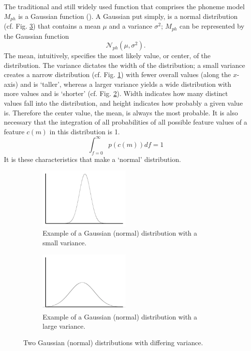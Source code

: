 The traditional and still widely used function that comprises the phoneme model $M_{ph}$ is a Gaussian function (\cite{gales:07}).  A Gaussian put simply, is a normal distribution (cf. Fig. \ref{fig:norm-dist}) that contains a mean $\mu$ and a variance $\sigma^2$; $M_{ph}$ can be represented by the Gaussian function \begin{equation} \mathcal{N}_{ph}(\mu,\sigma^2). \end{equation}  The mean, intuitively, specifies the most likely value, or center, of the distribution.  The variance dictates the width of the distribution; a small variance creates a narrow distribution (cf. Fig. \ref{fig:norm-narrow}) with fewer overall values (along the $x$-axis) and is `taller', whereas a larger variance yields a wide distribution with more values and is `shorter' (cf. Fig. \ref{fig:norm-wide}).  Width indicates how many distinct values fall into the distribution, and height indicates how probably a given value is.  Therefore the center value, the mean, is always the most probable.  It is also necessary that the integration of all probabilities of all possible feature values of a feature $c(m)$ in this distribution is 1. \begin{equation} \int_{f=0}^\infty p(c(m)) df = 1 \end{equation}  It is these characteristics that make a `normal' distribution.  
%
\begin{figure}[H]
\centering
\begin{subfigure}[c!]{0.5\textwidth}
\centering
\includegraphics[width=0.5\textwidth]{figure/norm-narrow.png}
\caption{Example of a Gaussian (normal) distribution with a small variance.}\label{fig:norm-narrow}
\end{subfigure}
\qquad
\begin{subfigure}[c!]{0.5\textwidth}
\centering
\includegraphics[width=0.5\textwidth]{figure/norm-wide.png}
\caption{Example of a Gaussian (normal) distribution with a large variance.}\label{fig:norm-wide}
\end{subfigure}
\caption{Two Gaussian (normal) distributions with differing variance.}\label{fig:norm-dist}
\end{figure}


